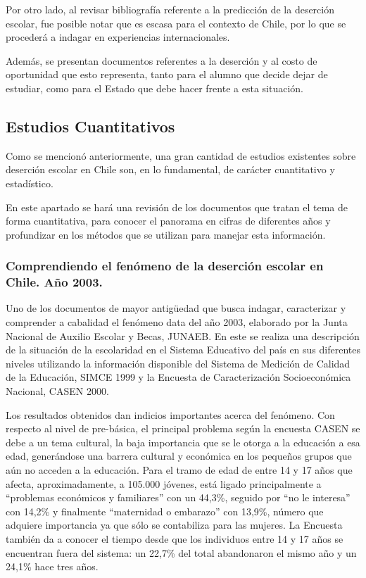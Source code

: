 Por otro lado, al revisar bibliografía referente a la predicción de la deserción escolar, fue posible notar que es escasa para el contexto de Chile, por lo que se procederá a indagar en experiencias internacionales. 

Además, se presentan documentos referentes a la deserción y al costo de oportunidad que esto representa, tanto para el alumno que decide dejar de estudiar, como para el Estado que debe hacer frente a esta situación. 

\subsection{Estudios Cuantitativos}
Como se mencionó anteriormente, una gran cantidad de estudios existentes sobre deserción escolar en Chile son, en lo fundamental, de carácter cuantitativo y estadístico. 

En este apartado se hará una revisión de los documentos que tratan el tema de forma cuantitativa, para conocer el panorama en cifras de diferentes años y profundizar en los métodos que se utilizan para manejar esta información. 

\subsubsection{Comprendiendo el fenómeno de la deserción escolar en Chile. Año 2003.}
Uno de los documentos de mayor antigüedad que busca indagar, caracterizar y comprender a cabalidad el fenómeno data del año 2003, elaborado por la Junta Nacional de Auxilio Escolar y Becas, JUNAEB. En este se realiza una descripción de la situación de la escolaridad en el Sistema Educativo del país en sus diferentes niveles utilizando la información disponible del Sistema de Medición de Calidad de la Educación, SIMCE 1999 y la Encuesta de Caracterización Socioeconómica Nacional, CASEN 2000. 

Los resultados obtenidos dan indicios importantes acerca del fenómeno. Con respecto al nivel de pre-básica, el principal problema según la encuesta CASEN se debe a un tema cultural, la baja importancia que se le otorga a la educación a esa edad, generándose una barrera cultural y económica en los pequeños grupos que aún no acceden a la educación. Para el tramo de edad de entre 14 y 17 años que afecta, aproximadamente, a 105.000 jóvenes, está ligado principalmente a “problemas económicos y familiares” con un 44,3\%, seguido por “no le interesa” con 14,2\% y finalmente “maternidad o embarazo” con 13,9\%, número que adquiere importancia ya que sólo se contabiliza para las mujeres. La Encuesta también da a conocer el tiempo desde que los individuos entre 14 y 17 años se encuentran fuera del sistema: un 22,7\% del total abandonaron el mismo año y un 24,1\% hace tres años. 

